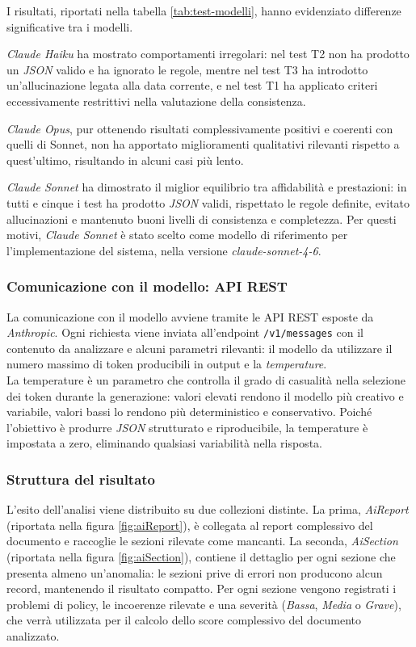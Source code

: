 I risultati, riportati nella tabella \ref{tab:test-modelli}, hanno evidenziato differenze significative tra i modelli. 

\emph{Claude Haiku} ha mostrato comportamenti irregolari: nel test T2 non ha prodotto un \emph{JSON} valido e ha ignorato le regole, mentre nel test T3 ha introdotto un'allucinazione legata alla data corrente, e nel test T1 ha applicato criteri eccessivamente restrittivi nella valutazione della consistenza. 

\emph{Claude Opus}, pur ottenendo risultati complessivamente positivi e coerenti con quelli di Sonnet, non ha apportato miglioramenti qualitativi rilevanti rispetto a quest'ultimo, risultando in alcuni casi più lento. 

\emph{Claude Sonnet} ha dimostrato il miglior equilibrio tra affidabilità e prestazioni: in tutti e cinque i test ha prodotto \emph{JSON} validi, rispettato le regole definite, evitato allucinazioni e mantenuto buoni livelli di consistenza e completezza. Per questi motivi, \emph{Claude Sonnet} è stato scelto come modello di riferimento per l'implementazione del sistema, nella versione \emph{claude-sonnet-4-6}.

\subsubsection[Comunicazione con il modello]{Comunicazione con il modello: API REST}
La comunicazione con il modello avviene tramite le API REST esposte da \emph{Anthropic}. Ogni richiesta viene inviata all'endpoint \texttt{/v1/messages} con il contenuto da analizzare e alcuni parametri rilevanti: il modello da utilizzare il numero massimo di token producibili in output e la \emph{temperature}.\\

La temperature è un parametro che controlla il grado di casualità nella selezione dei token durante la generazione: valori elevati rendono il modello più creativo e variabile, valori bassi lo rendono più deterministico e conservativo. Poiché l'obiettivo è produrre \emph{JSON} strutturato e riproducibile, la temperature è impostata a zero, eliminando qualsiasi variabilità nella risposta.

\subsubsection{Struttura del risultato}
L'esito dell'analisi viene distribuito su due collezioni distinte. La prima, \textit{AiReport} (riportata nella figura \ref{fig:aiReport}), è collegata al report complessivo del documento e raccoglie le sezioni rilevate come mancanti. La seconda, \textit{AiSection} (riportata nella figura \ref{fig:aiSection}), contiene il dettaglio per ogni sezione che presenta almeno un'anomalia: le sezioni prive di errori non producono alcun record, mantenendo il risultato compatto. Per ogni sezione vengono registrati i problemi di policy, le incoerenze rilevate e una severità (\textit{Bassa}, \textit{Media} o \textit{Grave}), che verrà utilizzata per il calcolo dello score complessivo del documento analizzato.

